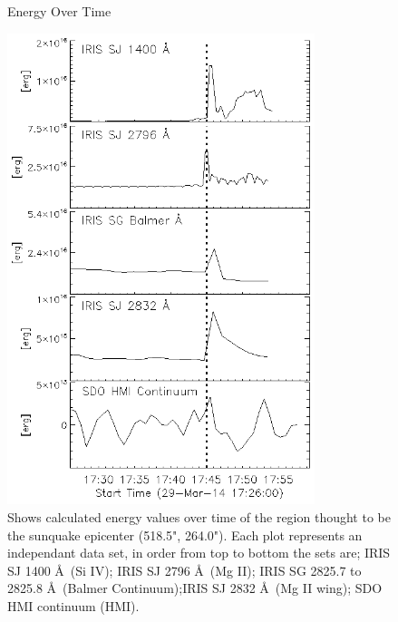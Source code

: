 \begin{figure}[H]
  \caption{Energy Over Time}
  \begin{center}
  \includegraphics[width=0.8\textwidth]{29-Mar-14-Quake-Energy-Ladder}
  \end{center}
  \caption{Shows calculated energy values over time of the region thought to be the sunquake epicenter (518.5", 264.0"). Each plot represents an independant data set, in order from top to bottom the sets are; IRIS SJ 1400 \AA\ (Si IV); IRIS SJ 2796 \AA\ (Mg II); IRIS SG  2825.7 to 2825.8 \AA\ (Balmer Continuum);IRIS SJ 2832 \AA\ (Mg II wing); SDO HMI continuum (HMI).}\label{eqk}
\end{figure}
